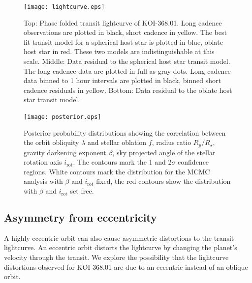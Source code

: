 \documentclass[preprint]{emulateapj}
\begin{document}


\begin{figure}[h!]
  \centering
  \texttt{[image: lightcurve.eps]}
  \caption{Top: Phase folded transit lightcurve of KOI-368.01. Long
    cadence observations are plotted in black, short cadence in
    yellow. The best fit transit model for a spherical host star is
    plotted in blue, oblate host star in red. These two models are
    indistinguishable at this scale. Middle: Data residual to the
    spherical host star transit model. The long cadence data are
    plotted in full as gray dots. Long cadence data binned to 1 hour
    intervals are plotted in black, binned short cadence residuals in yellow. Bottom:
    Data residual to the oblate host star transit model.}
  \label{fig:lightcurve}
\end{figure}

\begin{figure}[h!]
  \centering
  \texttt{[image: posterior.eps]}
  \caption{Posterior probability distributions showing the correlation
  between the orbit obliquity $\lambda$ and stellar oblation $f$,
  radius ratio $R_p/R_\star$, gravity darkening exponent $\beta$, sky
  projected angle of the stellar rotation axis $i_\text{rot}$. The
  contours mark the 1 and 2$\sigma$ confidence regions. White contours
mark the distribution for the MCMC analysis with $\beta$ and
$i_\text{rot}$ fixed, the red contours show the distribution with
$\beta$ and $i_\text{rot}$ set free.}
  \label{fig:posterior}
\end{figure}

\subsection{Asymmetry from eccentricity}
\label{sec:asymm-from-eccentr}

A highly eccentric orbit can also cause asymmetric distortions to the
transit lightcurve. An eccentric orbit distorts the lightcurve by
changing the planet's velocity through the transit. We explore the
possibility that the lightcurve distortions observed for KOI-368.01
are due to an eccentric instead of an oblique orbit.
\end{document}
